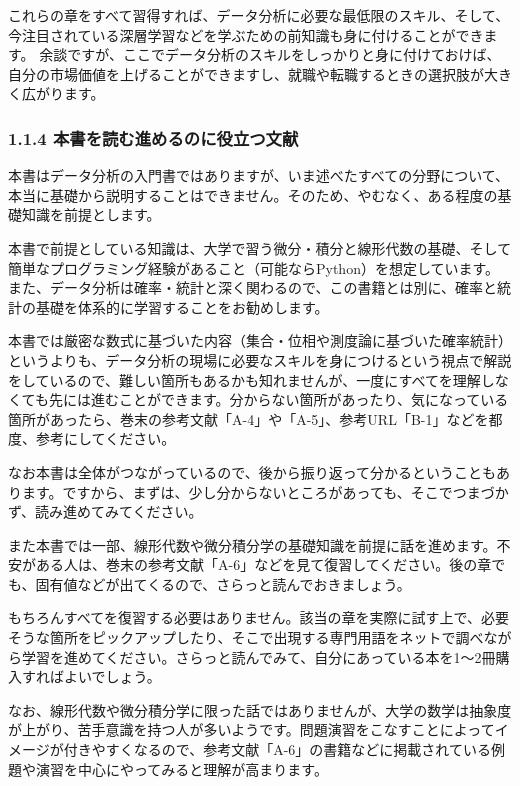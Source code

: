 \documentclass[11pt]{article}
\begin{document}
これらの章をすべて習得すれば、データ分析に必要な最低限のスキル、そして、今注目されている深層学習などを学ぶための前知識も身に付けることができます。
余談ですが、ここでデータ分析のスキルをしっかりと身に付けておけば、自分の市場価値を上げることができますし、就職や転職するときの選択肢が大きく広がります。

    \subsubsection{1.1.4
本書を読む進めるのに役立つ文献}\label{ux672cux66f8ux3092ux8aadux3080ux9032ux3081ux308bux306eux306bux5f79ux7acbux3064ux6587ux732e}

本書はデータ分析の入門書ではありますが、いま述べたすべての分野について、本当に基礎から説明することはできません。そのため、やむなく、ある程度の基礎知識を前提とします。

本書で前提としている知識は、大学で習う微分・積分と線形代数の基礎、そして簡単なプログラミング経験があること（可能ならPython）を想定しています。また、データ分析は確率・統計と深く関わるので、この書籍とは別に、確率と統計の基礎を体系的に学習することをお勧めします。

本書では厳密な数式に基づいた内容（集合・位相や測度論に基づいた確率統計）というよりも、データ分析の現場に必要なスキルを身につけるという視点で解説をしているので、難しい箇所もあるかも知れませんが、一度にすべてを理解しなくても先には進むことができます。分からない箇所があったり、気になっている箇所があったら、巻末の参考文献「A-4」や「A-5」、参考URL「B-1」などを都度、参考にしてください。

なお本書は全体がつながっているので、後から振り返って分かるということもあります。ですから、まずは、少し分からないところがあっても、そこでつまづかず、読み進めてみてください。

    また本書では一部、線形代数や微分積分学の基礎知識を前提に話を進めます。不安がある人は、巻末の参考文献「A-6」などを見て復習してください。後の章でも、固有値などが出てくるので、さらっと読んでおきましょう。

もちろんすべてを復習する必要はありません。該当の章を実際に試す上で、必要そうな箇所をピックアップしたり、そこで出現する専門用語をネットで調べながら学習を進めてください。さらっと読んでみて、自分にあっている本を1～2冊購入すればよいでしょう。

なお、線形代数や微分積分学に限った話ではありませんが、大学の数学は抽象度が上がり、苦手意識を持つ人が多いようです。問題演習をこなすことによってイメージが付きやすくなるので、参考文献「A-6」の書籍などに掲載されている例題や演習を中心にやってみると理解が高まります。
\end{document}
